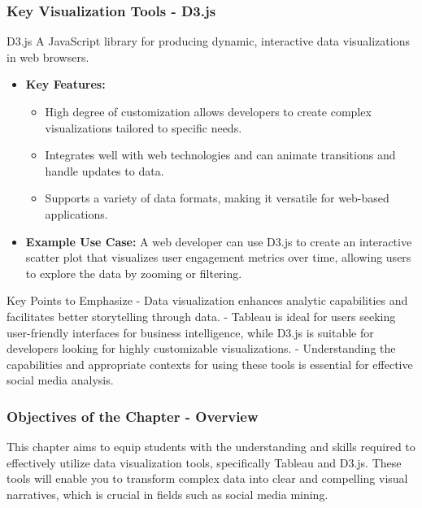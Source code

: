 \documentclass{beamer}
\begin{document}
\begin{frame}[fragile]
    \frametitle{Key Visualization Tools - D3.js}
    \begin{block}{D3.js}
        A JavaScript library for producing dynamic, interactive data visualizations in web browsers.
        \begin{itemize}
            \item \textbf{Key Features:}
            \begin{itemize}
                \item High degree of customization allows developers to create complex visualizations tailored to specific needs.
                \item Integrates well with web technologies and can animate transitions and handle updates to data.
                \item Supports a variety of data formats, making it versatile for web-based applications.
            \end{itemize}
            \item \textbf{Example Use Case:} 
            A web developer can use D3.js to create an interactive scatter plot that visualizes user engagement metrics over time, allowing users to explore the data by zooming or filtering.
        \end{itemize}
    \end{block}
    
    \begin{block}{Key Points to Emphasize}
        - Data visualization enhances analytic capabilities and facilitates better storytelling through data.
        - Tableau is ideal for users seeking user-friendly interfaces for business intelligence, while D3.js is suitable for developers looking for highly customizable visualizations.
        - Understanding the capabilities and appropriate contexts for using these tools is essential for effective social media analysis.
    \end{block}
\end{frame}

\begin{frame}[fragile]
    \frametitle{Objectives of the Chapter - Overview}
    This chapter aims to equip students with the understanding and skills required to effectively utilize data visualization tools, specifically Tableau and D3.js. These tools will enable you to transform complex data into clear and compelling visual narratives, which is crucial in fields such as social media mining.
\end{frame}
\end{document}
